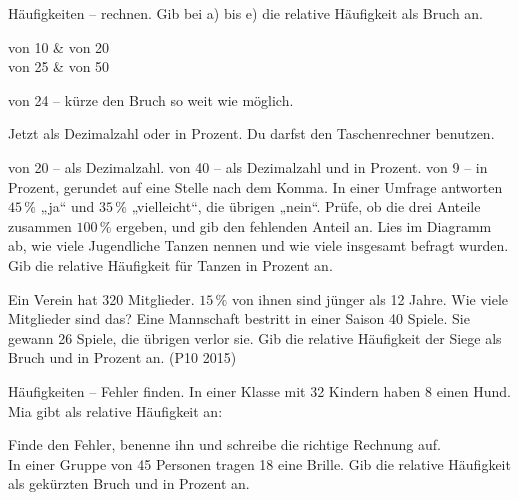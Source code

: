 \begin{aufgabe}{Häufigkeiten -- rechnen. Gib bei a) bis e) die relative Häufigkeit als Bruch an.}
\begin{teilezwei}
 von 10 \leerfeld &  von 20 \leerfeld \\
 von 25 \leerfeld &  von 50 \leerfeld \\
\end{teilezwei}
\begin{teile}
 von 24 -- kürze den Bruch so weit wie möglich. \leerfeld
\end{teile}

Jetzt als Dezimalzahl oder in Prozent. Du darfst den Taschenrechner benutzen.
\begin{teile}
 von 20 -- als Dezimalzahl. 
 von 40 -- als Dezimalzahl und in Prozent.  \leerfeld[\%]
 von 9 -- in Prozent, gerundet auf eine Stelle nach dem Komma. \leerfeld[\%]
\teil In einer Umfrage antworten $45\,\%$ „ja“ und $35\,\%$ „vielleicht“, die übrigen „nein“. Prüfe, ob die drei Anteile zusammen $100\,\%$ ergeben, und gib den fehlenden Anteil an. \leerfeld[\%]
\teil Lies im Diagramm ab, wie viele Jugendliche Tanzen nennen und wie viele insgesamt befragt wurden. Gib die relative Häufigkeit für Tanzen in Prozent an. \leerfeld[\%]
\end{teile}

\noindent{}

\begin{teile}
\teil Ein Verein hat 320 Mitglieder. $15\,\%$ von ihnen sind jünger als 12 Jahre. Wie viele Mitglieder sind das? \leerfeld
\teil Eine Mannschaft bestritt in einer Saison 40 Spiele. Sie gewann 26 Spiele, die übrigen verlor sie. Gib die relative Häufigkeit der Siege als Bruch und in Prozent an. (P10 2015)
\par {} \leerfeld[\%]
\end{teile}
\end{aufgabe}

\begin{aufgabe}{Häufigkeiten -- Fehler finden.}
In einer Klasse mit 32 Kindern haben 8 einen Hund. Mia gibt als relative Häufigkeit an:
\begin{teile}
\teil Finde den Fehler, benenne ihn und schreibe die richtige Rechnung auf. \\[12pt]
\teil In einer Gruppe von 45 Personen tragen 18 eine Brille. Gib die relative Häufigkeit als gekürzten Bruch und in Prozent an. \par {} \leerfeld[\%]
\end{teile}
\end{aufgabe}

